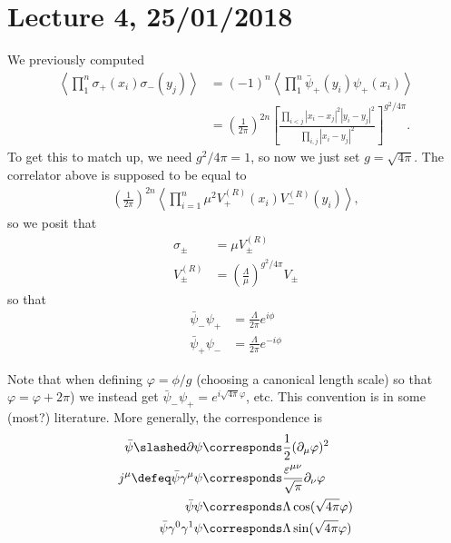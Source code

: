\section*{Lecture 4, 25/01/2018}

We previously computed
\begin{align*}
\left \langle \prod_1^n \sigma_+(x_i) \sigma_-(y_j) \right \rangle &= (-1)^n \left \langle \prod_1^n \bar \psi_+(y_i) \psi_+(x_i) \right \rangle\\
&= \left ( \frac{1}{2 \pi} \right)^{2n} \left [ \frac{ \prod_{i < j} |x_i - x_j|^2 |y_i - y_j|^2 }{ \prod_{i,j} |x_i - y_j|^2 } \right ]^{g^2/4 \pi}.
\end{align*}
To get this to match up, we need $g^2/4 \pi = 1$, so now we just set $g = \sqrt{4\pi}$.
The correlator above is supposed to be equal to
\begin{align*}
\left( \frac{1}{2 \pi}\right)^{2n} \left \langle \prod_{i = 1}^n \mu^2 V_+^{(R)}(x_i) V_-^{(R)}(y_i) \right \rangle,
\end{align*}
so we posit that
\begin{align*}
\sigma_\pm &= \mu V_\pm^{(R)}\\
V_\pm^{(R)} &= \left( \frac{\Lambda}{\mu} \right)^{g^2/4 \pi} V_\pm
\end{align*}
so that
\begin{align*}
\bar \psi_- \psi_+ &= \frac{\Lambda}{2 \pi} e^{i \phi}\\
\bar \psi_+ \psi_- &= \frac{\Lambda}{2 \pi} e^{-i \phi}
\end{align*}

Note that when defining $\varphi = \phi/g$ (choosing a canonical length scale) so that $\varphi = \varphi + 2 \pi$) we instead get $\bar \psi_- \psi_+ = e^{i \sqrt{4\pi} \varphi}$, etc.
This convention is in some (most?) literature.
More generally, the correspondence is
\begin{align*}
\bar \psi \slashed \partial \psi &\corresponds \frac{1}{2} (\partial_\mu \varphi)^2\\
j^\mu \defeq \bar \psi \gamma^\mu \psi &\corresponds \frac{\varepsilon^{\mu \nu}}{\sqrt \pi} \partial_\nu \varphi\\
\bar \psi \psi &\corresponds \Lambda \cos(\sqrt{4 \pi} \varphi)\\
\bar \psi \gamma^0 \gamma^1 \psi &\corresponds \Lambda \sin(\sqrt{4 \pi} \varphi)
\end{align*}

